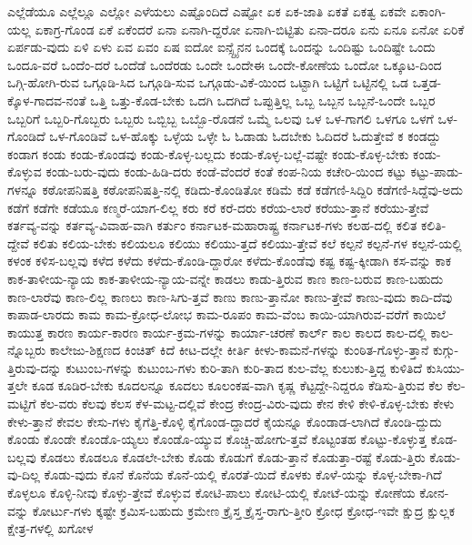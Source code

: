 {ಎಲ್ಲೆಡೆಯೂ
ಎಲ್ಲೆಲ್ಲೂ
ಎಲ್ಲೋ
ಎಳೆಯಲು
ಎಷ್ಟೊಂದಿದೆ
ಎಷ್ಟೋ
ಏಕ
ಏಕ-ಜಾತಿ
ಏಕತೆ
ಏಕತ್ವ
ಏಕವೇ
ಏಕಾಂಗಿ-ಯಲ್ಲ
ಏಕಾಗ್ರ-ಗೊಂಡ
ಏಕೆ
ಏಕೆಂದರೆ
ಏನಾ
ಏನಾಗಿ-ದ್ದರೋ
ಏನಾಗಿ-ಬಿಟ್ಟಿತು
ಏನಾ-ದರೂ
ಏನು
ಏನೂ
ಏನೋ
ಏರಿಕೆ
ಏರ್ಪಡು-ವುದು
ಏಳಿ
ಏಳು
ಏವ
ಏವಂ
ಏಷ
ಐದೋ
ಐನ್ಸ್ಟೈನನ
ಒಂದಕ್ಕೆ
ಒಂದನ್ನು
ಒಂದಿಷ್ಟು
ಒಂದಿಷ್ಟೇ
ಒಂದು
ಒಂದೂ-ವರೆ
ಒಂದೆಂ-ದರೆ
ಒಂದೆಡೆ
ಒಂದೆರಡು
ಒಂದೇ
ಒಂದೇಈ
ಒಂದೇ-ಕೋಣೆಯ
ಒಂದೋ
ಒಕ್ಕೂಟ-ದಿಂದ
ಒಗ್ಗಿ-ಹೋಗಿ-ರುವ
ಒಗ್ಗೂಡಿ-ಸಿದ
ಒಗ್ಗೂಡಿ-ಸುವ
ಒಗ್ಗೂಡು-ವಿಕೆ-ಯಿಂದ
ಒಟ್ಟಾಗಿ
ಒಟ್ಟಿಗೆ
ಒಟ್ಟಿನಲ್ಲಿ
ಒಡ
ಒತ್ತಡ-ಕ್ಕೊಳ-ಗಾದವ-ನಂತೆ
ಒತ್ತಿ
ಒತ್ತು-ಕೊಡ-ಬೇಕು
ಒದಗಿ
ಒದಗಿದೆ
ಒಪ್ಪುತ್ತಿಲ್ಲ
ಒಬ್ಬ
ಒಬ್ಬನ
ಒಬ್ಬನೆ-ಒಂದೇ
ಒಬ್ಬರ
ಒಬ್ಬರಿಗೆ
ಒಬ್ಬರಿ-ಗೊಬ್ಬರು
ಒಬ್ಬರು
ಒಬ್ಬಿಬ್ಬ
ಒಬ್ಬೊ-ರೊಡನೆ
ಒಮ್ಮೆ
ಒಲವು
ಒಳ
ಒಳ-ಗಾಗಲಿ
ಒಳಗೂ
ಒಳಗೆ
ಒಳ-ಗೊಂಡಿದೆ
ಒಳ-ಗೊಂಡಿವೆ
ಒಳ-ಹೊಕ್ಕು
ಒಳ್ಳೆಯ
ಒಳ್ಳೇ
ಓ
ಓಡಾಡು
ಓದಬೇಕು
ಓದಿದರೆ
ಓದುತ್ತೇವೆ
ಕ
ಕಂಡದ್ದು
ಕಂಡಾಗ
ಕಂಡು
ಕಂಡು-ಕೊಂಡವು
ಕಂಡು-ಕೊಳ್ಳ-ಬಲ್ಲದು
ಕಂಡು-ಕೊಳ್ಳ-ಬಲ್ಲೆ-ವಷ್ಟೇ
ಕಂಡು-ಕೊಳ್ಳ-ಬೇಕು
ಕಂಡು-ಕೊಳ್ಳುವ
ಕಂಡು-ಬರು-ವುದು
ಕಂಡು-ಹಿಡಿ-ದರು
ಕಂಡೆ-ವೆಂದರೆ
ಕಂತೆ
ಕಂಪ-ನಿಯ
ಕಚೇರಿ-ಯಿಂದ
ಕಟ್ಟು
ಕಟ್ಟು-ಪಾಡು-ಗಳನ್ನೂ
ಕಠೋಪನಿಷತ್ತಿ
ಕಠೋಪನಿಷತ್ತಿ-ನಲ್ಲಿ
ಕಡಿದು-ಕೊಂಡಿತೋ
ಕಡಿಮೆ
ಕಡೆ
ಕಡೆಗಣಿ-ಸಿದ್ದಿರಿ
ಕಡೆಗಣಿ-ಸಿದ್ದೆವು-ಅದು
ಕಡೆಗೆ
ಕಡೆಗೇ
ಕಡೆಯೂ
ಕಣ್ಮರೆ-ಯಾಗ-ಲಿಲ್ಲ
ಕರು
ಕರೆ
ಕರೆ-ದರು
ಕರೆಯ-ಲಾರೆ
ಕರೆಯು-ತ್ತಾನೆ
ಕರೆಯು-ತ್ತೇವೆ
ಕರ್ತವ್ಯ-ವನ್ನು
ಕರ್ತವ್ಯ-ವಿವಾಹ-ವಾಗಿ
ಕರ್ತುಂ
ಕರ್ನಾಟಕ-ಮಹಾರಾಷ್ಟ್ರ
ಕರ್ನಾಟಕ-ಗಳು
ಕಲಹ-ದಲ್ಲಿ
ಕಲಿತ
ಕಲಿತಿ-ದ್ದೇವೆ
ಕಲಿತು
ಕಲಿಯ-ಬೇಕು
ಕಲಿಯಲೂ
ಕಲಿಯು
ಕಲಿಯು-ತ್ತದೆ
ಕಲಿಯು-ತ್ತೇವೆ
ಕಲೆ
ಕಲ್ಪನೆ
ಕಲ್ಪನೆ-ಗಳ
ಕಲ್ಪನೆ-ಯಲ್ಲಿ
ಕಳಂಕ
ಕಳಿಸ-ಬಲ್ಲವು
ಕಳೆದ
ಕಳೆದು
ಕಳೆದು-ಕೊಂಡಿ-ದ್ದಾರೋ
ಕಳೆದು-ಕೊಂಡೆವು
ಕಷ್ಟ
ಕಷ್ಟ-ಕ್ಕೀಡಾಗಿ
ಕಸ-ವನ್ನು
ಕಾಕ
ಕಾಕ-ತಾಳೀಯ-ನ್ಯಾಯ
ಕಾಕ-ತಾಳೀಯ-ನ್ಯಾಯ-ವನ್ನೇ
ಕಾಡಲು
ಕಾಡು-ತ್ತಿರುವ
ಕಾಣ
ಕಾಣ-ಬರುವ
ಕಾಣ-ಬಹುದು
ಕಾಣ-ಲಾರೆವು
ಕಾಣ-ಲಿಲ್ಲ
ಕಾಣಲು
ಕಾಣ-ಸಿಗು-ತ್ತವೆ
ಕಾಣು
ಕಾಣು-ತ್ತಾನೋ
ಕಾಣು-ತ್ತೇವೆ
ಕಾಣು-ವುದು
ಕಾದಿ-ದೆವು
ಕಾಪಾಡ-ಲಾರದು
ಕಾಮ
ಕಾಮ-ಕ್ರೋಧ-ಲೋಭ
ಕಾಮ-ರೂಪಂ
ಕಾಮ-ವೆಂಬ
ಕಾಯಿ-ಯಾಗಿರುವ-ವರೆಗೆ
ಕಾಯಿಲೆ
ಕಾಯುತ್ತ
ಕಾರಣ
ಕಾರ್ಯ-ಕಾರಣ
ಕಾರ್ಯ-ಕ್ರಮ-ಗಳನ್ನು
ಕಾರ್ಯಾ-ಚರಣೆ
ಕಾರ್ಲ್
ಕಾಲ
ಕಾಲದ
ಕಾಲ-ದಲ್ಲಿ
ಕಾಲ-ನ್ನೊಬ್ಬರು
ಕಾಲೇಜು-ಶಿಕ್ಷಣದ
ಕಿಂಚಿತ್
ಕಿದೆ
ಕೀಟ-ದಲ್ಲೇ
ಕೀರ್ತಿ
ಕೀಳು-ಕಾಮನೆ-ಗಳನ್ನು
ಕುಂಠಿತ-ಗೊಳ್ಳು-ತ್ತಾನೆ
ಕುಗ್ಗು-ತ್ತಿರುವು-ದನ್ನು
ಕುಟುಂಬ-ಗಳನ್ನು
ಕುಟುಂಬ-ಗಳು
ಕುರಿ-ತಾಗಿ
ಕುರಿ-ತಾದ
ಕುಲ-ವೆಲ್ಲ
ಕುಲುಕು-ತ್ತಿದ್ದ
ಕುಳಿತಿದೆ
ಕುಸಿಯು-ತ್ತಲೇ
ಕೂಡ
ಕೂಡಿರ-ಬೇಕು
ಕೂದಲನ್ನೂ
ಕೂದಲು
ಕೂಲಂಕಷ-ವಾಗಿ
ಕೃಷ್ಣ
ಕೆಟ್ಟದ್ದೇ-ನಿದ್ದರೂ
ಕೆಡಿಸು-ತ್ತಿರುವ
ಕೆಲ
ಕೆಲ-ಮಟ್ಟಿಗೆ
ಕೆಲ-ವರು
ಕೆಲವು
ಕೆಲಸ
ಕೆಳ-ಮಟ್ಟ-ದಲ್ಲಿವೆ
ಕೇಂದ್ರ
ಕೇಂದ್ರ-ವಿರು-ವುದು
ಕೇನ
ಕೇಳಿ
ಕೇಳಿ-ಕೊಳ್ಳ-ಬೇಕು
ಕೇಳು
ಕೇಳು-ತ್ತಾನೆ
ಕೇವಲ
ಕೇಸು-ಗಳು
ಕೈಗೆತ್ತಿ-ಕೊಳ್ಳಿ
ಕೈಗೊಂಡ-ದ್ದಾದರೆ
ಕೈಯನ್ನೂ
ಕೊಂಡಾಡ-ಲಾಗಿದೆ
ಕೊಂಡಿ-ದ್ದುದು
ಕೊಂಡು
ಕೊಂಡೇ
ಕೊಂಡೊ-ಯ್ಯಲು
ಕೊಂಡೊ-ಯ್ಯುವ
ಕೊಚ್ಚಿ-ಹೋಗು-ತ್ತವೆ
ಕೊಟ್ಟಂತಹ
ಕೊಟ್ಟು-ಕೊಳ್ಳುತ್ತ
ಕೊಡ-ಬಲ್ಲವು
ಕೊಡಲು
ಕೊಡಲೂ
ಕೊಡಲೇ-ಬೇಕು
ಕೊಡು
ಕೊಡುಗೆ
ಕೊಡು-ತ್ತಾನೆ
ಕೊಡುತ್ತಾ-ರಷ್ಟೆ
ಕೊಡು-ತ್ತಿರು
ಕೊಡು-ವು-ದಿಲ್ಲ
ಕೊಡು-ವುದು
ಕೊನೆ
ಕೊನೆಯ
ಕೊನೆ-ಯಲ್ಲಿ
ಕೊರತೆ-ಯಿದೆ
ಕೊಳಕು
ಕೊಳೆ-ಯನ್ನು
ಕೊಳ್ಳ-ಬೇಕಾ-ಗಿದೆ
ಕೊಳ್ಳಲೂ
ಕೊಳ್ಳಿ-ನೀವು
ಕೊಳ್ಳು-ತ್ತೇವೆ
ಕೊಳ್ಳುವ
ಕೋಟಿ-ಪಾಲು
ಕೋಟಿ-ಯಲ್ಲಿ
ಕೋಟೆ-ಯನ್ನು
ಕೋಣೆಯ
ಕೋನ-ವನ್ನು
ಕೋರ್ಟು-ಗಳು
ಕ್ಕಷ್ಟೇ
ಕ್ರಮಿಸ-ಬಹುದು
ಕ್ರಮೇಣ
ಕ್ರೈಸ್ತ
ಕ್ರೈಸ್ತ-ರಾಗು-ತ್ತೀರಿ
ಕ್ರೋಧ
ಕ್ರೋಧ-ಇವೇ
ಕ್ಷುದ್ರ
ಕ್ಷುಲ್ಲಕ
ಕ್ಷೇತ್ರ-ಗಳಲ್ಲಿ
ಖಗೋಳ
}
